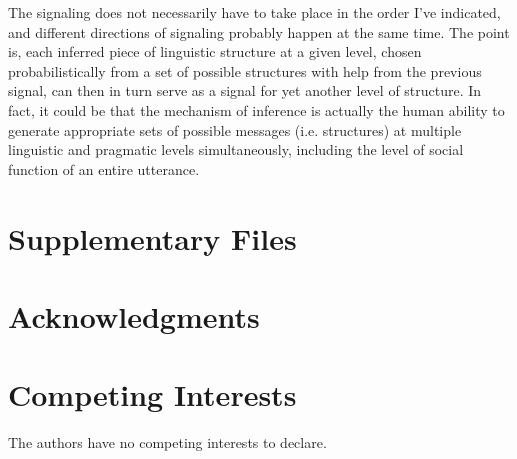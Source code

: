 \documentclass[12pt]{article}
\begin{document}
The signaling does not necessarily have to take place in the order I've indicated, and different directions of signaling probably happen at the same time. The point is, each inferred piece of linguistic structure at a given level, chosen probabilistically from a set of possible structures with help from the previous signal, can then in turn serve as a signal for yet another level of structure. In fact, it could be that the mechanism of inference is actually the human ability to generate appropriate sets of possible messages (i.e. structures) at multiple linguistic and pragmatic levels simultaneously, including the level of social function of an entire utterance. 

\section*{Supplementary Files}

\section*{Acknowledgments}

\section*{Competing Interests}

The authors have no competing interests to declare.




\end{document}
